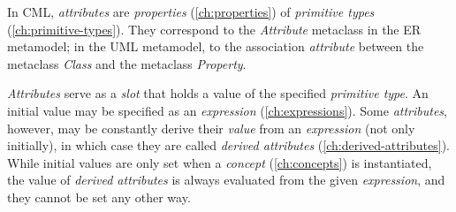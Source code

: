 In CML, \emph{attributes} are \emph{properties} (\ref{ch:properties})
of \emph{primitive types} (\ref{ch:primitive-types}).
They correspond to the \emph{Attribute} metaclass 
in the ER \cite{er} metamodel;
in the UML \cite{uml} metamodel,
to the association \emph{attribute} between the metaclass \emph{Class} 
and the metaclass \emph{Property}.

\emph{Attributes} serve as a \emph{slot} that holds a value of 
the specified \emph{primitive type}.
An initial value may be specified as an \emph{expression} (\ref{ch:expressions}).
Some \emph{attributes}, however, may be constantly
derive their \emph{value} from an \emph{expression} (not only initially),
in which case they are called \emph{derived attributes} (\ref{ch:derived-attributes}).
While initial values are only set when a \emph{concept} (\ref{ch:concepts})
is instantiated,
the value of \emph{derived attributes} is always evaluated 
from the given \emph{expression},
and they cannot be set any other way.


